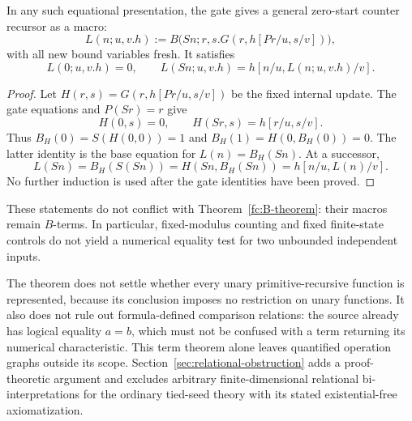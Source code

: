 \begin{lemma}
\label{fc:zero-start-lemma}
In any such equational presentation, the gate gives a general zero-start
counter recursor as a macro:
\[
 L(n;u,v.h)
   :=B\bigl(Sn;r,s.G(r,h[Pr/u,s/v])\bigr),
 \tag{Zero-start macro}\label{fc:zero-start}
\]
with all new bound variables fresh. It satisfies
\[
 L(0;u,v.h)=0,\qquad
 L(Sn;u,v.h)=h[n/u,L(n;u,v.h)/v].
\]
\end{lemma}

\begin{proof}
Let $H(r,s)=G(r,h[Pr/u,s/v])$ be the fixed internal update. The gate
equations and $P(Sr)=r$ give
\[
               H(0,s)=0,\qquad H(Sr,s)=h[r/u,s/v].
\]
Thus $B_H(0)=S(H(0,0))=1$ and
$B_H(1)=H(0,B_H(0))=0$. The latter identity is the base equation for
$L(n)=B_H(Sn)$. At a successor,
\[
 L(Sn)=B_H(S(Sn))=H(Sn,B_H(Sn))=h[n/u,L(n)/v].
\]
No further induction is used after the gate identities have been proved.
\end{proof}

These statements do not conflict with Theorem~\ref{fc:B-theorem}:
their macros remain $B$-terms. In particular, fixed-modulus counting
and fixed finite-state controls do not yield a numerical equality
test for two unbounded independent inputs.

The theorem does not settle whether every unary primitive-recursive
function is represented, because its conclusion imposes no restriction
on unary functions. It also does not rule out formula-defined comparison
relations: the source already has logical equality $a=b$, which must
not be confused with a term returning its numerical characteristic.
This term theorem alone leaves quantified operation graphs outside its
scope. Section~\ref{sec:relational-obstruction} adds a proof-theoretic
argument and excludes arbitrary finite-dimensional relational
bi-interpretations for the ordinary tied-seed theory with its stated
existential-free axiomatization.
